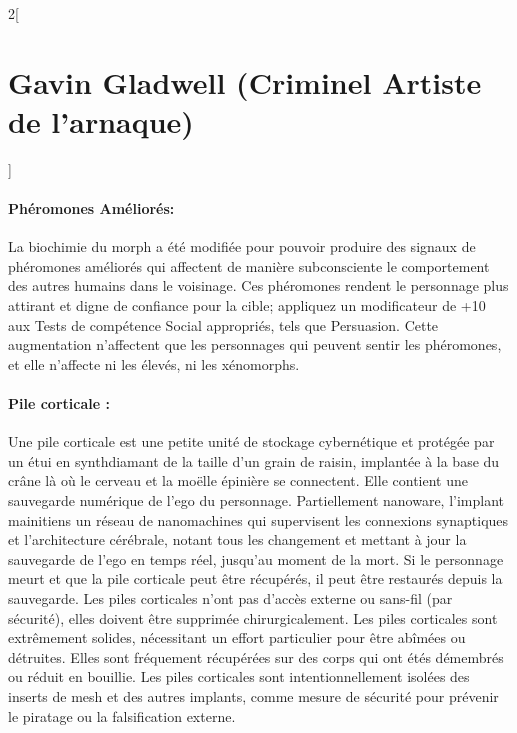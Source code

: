 \documentclass[a4paper,9pt]{article}
\begin{document}
\begin{multicols}{2}[\section*{Gavin Gladwell (Criminel Artiste de l'arnaque)}]
   \paragraph{Phéromones Améliorés: }La biochimie du morph a été modifiée pour
   pouvoir produire des signaux de phéromones améliorés qui affectent de manière
   subconsciente le comportement des autres humains dans le voisinage. Ces
   phéromones rendent le personnage plus attirant et digne de confiance pour la
   cible; appliquez un modificateur de +10 aux Tests de compétence Social
   appropriés, tels que Persuasion. Cette augmentation n'affectent que les
   personnages qui peuvent sentir les phéromones, et elle n'affecte ni les élevés,
   ni les xénomorphs.

   \paragraph{Pile corticale :}
   Une pile corticale est une petite unité de stockage cybernétique et protégée
   par un étui en synthdiamant de la taille d'un grain de raisin, implantée à la
   base du crâne là où le cerveau et la moëlle épinière se connectent. Elle
   contient une sauvegarde numérique de l'ego du personnage. Partiellement
   nanoware, l'implant mainitiens un réseau de nanomachines qui supervisent
   les connexions synaptiques et l'architecture cérébrale, notant tous les
   changement et mettant à jour la sauvegarde de l'ego en temps réel, jusqu'au
   moment de la mort. Si le personnage meurt et que la pile corticale peut être
   récupérés, il peut être restaurés depuis la sauvegarde. Les piles corticales
   n'ont pas d'accès externe ou sans-fil (par sécurité), elles doivent être
   supprimée chirurgicalement. Les piles corticales sont extrêmement solides,
   nécessitant un effort particulier pour être abîmées ou détruites. Elles sont
   fréquement récupérées sur des corps qui ont étés démembrés ou réduit en
   bouillie. Les piles corticales sont intentionnellement isolées des inserts de
   mesh et des autres implants, comme mesure de sécurité pour prévenir le piratage
   ou la falsification externe.

\end{multicols}

\newpage
\end{document}
